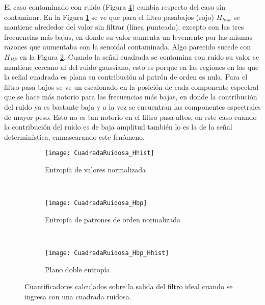 El caso contaminado con ruido (Figura \ref{fig:CuadradaRuidosa}) cambia respecto del caso sin contaminar.
En la Figura \ref{subfig:CuadradaRuidosa_Hhist} se ve que para el filtro pasabajos (rojo) $H_{hist}$ se mantiene alrededor del valor sin filtrar (línea punteada), excepto con las tres frecuencias más bajas, en donde su valor aumenta un levemente por las mismas razones que aumentaba con la senoidal contaminada.
Algo parecido sucede con $H_{BP}$ en la Figura \ref{subfig:CuadradaRuidosa_Hbp}.
Cuando la señal cuadrada se contamina con ruido su valor se mantiene cercano al del ruido gaussiano, esto es porque en las regiones en las que la señal cuadrada es plana su contribución al patrón de orden es nula.
Para el filtro pasa bajos se ve un escalonado en la posición de cada componente espectral que se hace más notorio para las frecuencias más bajas, en donde la contribución del ruido ya es bastante baja y a la vez se encuentran las componentes espectrales de mayor peso.
Esto no es tan notorio en el filtro pasa-altos, en este caso cuando la contribución del ruido es de baja amplitud también lo es la de la señal determinística, enmascarando este fenómeno.
%
\begin{figure}[h]
    \centering
    \begin{subfigure}[t]{.49\textwidth}
        \texttt{[image: CuadradaRuidosa\_Hhist]}
        \caption{Entropía de valores normalizada}
        \label{subfig:CuadradaRuidosa_Hhist}
    \end{subfigure}
    ~ %
    \begin{subfigure}[t]{.49\textwidth}
        \texttt{[image: CuadradaRuidosa\_Hbp]}
        \caption{Entropía de patrones de orden normalizada}
        \label{subfig:CuadradaRuidosa_Hbp}
    \end{subfigure}
    ~ %
    \begin{subfigure}[t]{.49\textwidth}
        \texttt{[image: CuadradaRuidosa\_Hbp\_Hhist]}
        \caption{Plano doble entropía}
        \label{subfig:CuadradaRuidosa_HbpHhist}
    \end{subfigure}
    \caption{Cuantificadores calculados sobre la salida del filtro ideal cuando se ingresa con una cuadrada ruidosa.}\label{fig:CuadradaRuidosa}
\end{figure}

